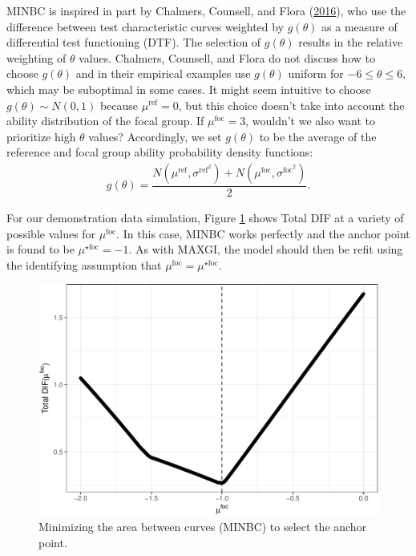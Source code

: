 \documentclass[
  11pt,
]{article}
\begin{document}
MINBC is inspired in part by Chalmers, Counsell, and Flora (\protect\hyperlink{ref-chalmers2016might}{2016}), who use the difference between test characteristic curves weighted by \(g(\theta)\) as a measure of differential test functioning (DTF). The selection of \(g(\theta)\) results in the relative weighting of \(\theta\) values. Chalmers, Counsell, and Flora do not discuss how to choose \(g(\theta)\) and in their empirical examples use \(g(\theta)\) uniform for \(-6 \le \theta \le 6\), which may be suboptimal in some cases. It might seem intuitive to choose \(g(\theta) \sim N(0, 1)\) because \(\mu^\text{ref} = 0\), but this choice doesn't take into account the ability distribution of the focal group. If \(\mu^\text{foc} = 3\), wouldn't we also want to prioritize high \(\theta\) values? Accordingly, we set \(g(\theta)\) to be the average of the reference and focal group ability probability density functions:
\begin{align}
g(\theta) = \dfrac{N(\mu^{\text{ref}}, \sigma^{\text{ref}^2}) + N(\mu^{\text{foc}}, \sigma^{\text{foc}^2})}{2}.
\end{align}

For our demonstration data simulation, Figure \ref{fig:mabc} shows Total DIF at a variety of possible values for \(\mu^\text{foc}\). In this case, MINBC works perfectly and the anchor point is found to be \(\mu^{\star\text{foc}} = -1\). As with MAXGI, the model should then be refit using the identifying assumption that \(\mu^{\text{foc}} = \mu^{\star\text{foc}}\).

\begin{figure}[H]

{\centering \includegraphics[width=0.7\linewidth]{paper_files/figure-latex/mabc-1} 

}

\caption{Minimizing the area between curves (MINBC) to select the anchor point.}\label{fig:mabc}
\end{figure}
\end{document}
